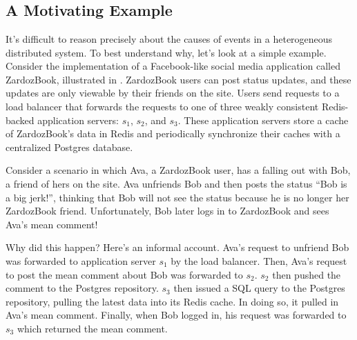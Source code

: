 \section{\WatProvenance{}}

\subsection{A Motivating Example}
\newcommand{\systemname}{ZardozBook}
It's difficult to reason precisely about the causes of events in a
heterogeneous distributed system. To best understand why, let's look at a
simple example. Consider the implementation of a Facebook-like social media
application called \systemname{}, illustrated in .
\systemname{} users can post status updates, and these updates
are only viewable by their friends on the site. Users send requests to a load
balancer that forwards the requests to one of three weakly consistent
Redis-backed application servers: $s_1$, $s_2$, and $s_3$. These application
servers store a cache of \systemname{}'s data in Redis and periodically
synchronize their caches with a centralized Postgres database.

Consider a scenario in which Ava, a \systemname{} user, has a falling out with
Bob, a friend of hers on the site. Ava unfriends Bob and then posts the status
``Bob is a big jerk!'', thinking that Bob will not see the status
because he is no longer her \systemname{} friend. Unfortunately, Bob later logs
in to \systemname{} and sees Ava's mean comment!

{}

Why did this happen? Here's an informal account. Ava's request to unfriend Bob
was forwarded to application server $s_1$ by the load balancer. Then, Ava's
request to post the mean comment about Bob was forwarded to $s_2$. $s_2$ then
pushed the comment to the Postgres repository. $s_3$ then issued a SQL query
to the Postgres repository, pulling the latest data into its Redis cache. In
doing so, it pulled in Ava's mean comment. Finally, when Bob logged in, his
request was forwarded to $s_3$ which returned the mean comment.

